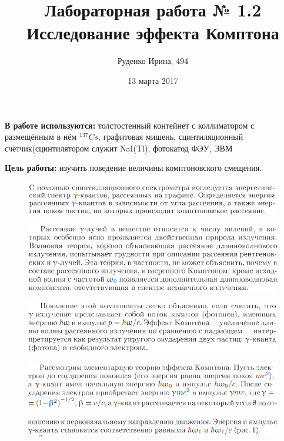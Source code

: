 \documentclass{article}
\title{Лабораторная работа № 1.2\\
Исследование эффекта Комптона}
\author{Руденко Ирина, 494}
\date{13 марта 2017}
\theoremstyle{remark}
\begin{document}
\maketitle

\textbf{В работе используются:}   толстостенный контейнет с коллиматором с размещённым в нём $^{137}Cs$, графитовая мишень, сцинтиляционный счётчик(сцинтилятором служит NaI(Tl), фотокатод ФЭУ, ЭВМ


\textbf{Цель работы:}  изучить поведение величины комптоновского смещения.

\begin{figure}[htp]
    \centering
    \includegraphics[width=1.1\linewidth]{1.png}

\end{figure}
\begin{figure}[htp]
    \centering
    \includegraphics[width=1.2\linewidth]{2.png}
\end{figure}

\begin{figure}[htp]
    \centering
    \includegraphics[width=1.2\linewidth]{3.png}
\end{figure}
\begin{figure}[htp]
    \centering
    \includegraphics[width=1.2\linewidth]{4.png}
\end{figure}
\begin{figure}[htp]
    \centering
    \includegraphics[width=1.2\linewidth]{5.png}
\end{figure}
\end{document}
